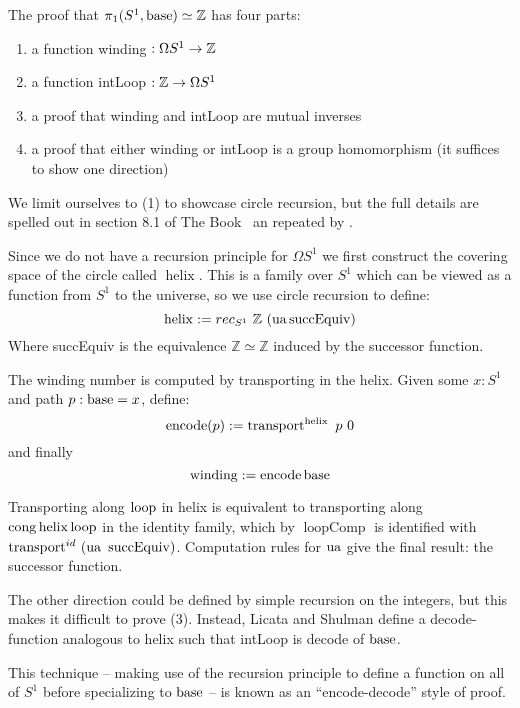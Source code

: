 The proof that $\pi_1(S^1, \operatorname{base}) \simeq \mathbb{Z}$ has four parts:
\begin{enumerate}
  \item a function winding $: \Omega S^1 \rightarrow \mathbb{Z}$
  \item a function intLoop $: \mathbb{Z} \rightarrow \Omega S^1$
  \item a proof that winding and intLoop are mutual inverses
  \item a proof that either winding or intLoop is a group homomorphism (it
    suffices to show one direction)
\end{enumerate}
We limit ourselves to (1) to showcase circle recursion, but the full
details are spelled out in section 8.1 of The Book~\cite{hottbook} an repeated
by \textcite{mortberg2020cubical}.

Since we do not have a recursion principle for $\Omega S^1$ we first construct the
covering space of the circle called $\operatorname{helix}$. This is a family over $S^1$
which can be viewed as a function from $S^1$ to the universe, so we use circle
recursion to define:
\[
  \operatorname{helix} := rec_{S^1} ~ \mathbb{Z} ~ (\operatorname{ua} \operatorname{succEquiv})
\]
Where succEquiv is the equivalence $\mathbb{Z} \simeq \mathbb{Z}$ induced by the
successor function.

The winding number is computed by transporting in the helix. Given some $x:S^1$
and path $p : \operatorname{base} = x$, define:
\[
  \operatorname{encode}(p) := \operatorname{transport}^{\operatorname{helix}}~p~0
\]
and finally
\[
  \operatorname{winding} := \operatorname{encode} \operatorname{base}
\]

Transporting along $\operatorname{loop}$ in helix is equivalent to transporting along
$\operatorname{cong} \operatorname{helix} \operatorname{loop}$ in the identity family, which by $\operatorname{loopComp}$
is identified with $\operatorname{transport}^{id}~(\operatorname{ua}~\operatorname{succEquiv})$. Computation
rules for $\operatorname{ua}$ give the final result: the successor function.

The other direction could be defined by simple recursion on the integers, but
this makes it difficult to prove (3). Instead, Licata and Shulman define a
decode-function analogous to helix such that intLoop is decode of $\operatorname{base}$.

This technique -- making use of the recursion principle to define a function on
all of $S^1$ before specializing to $\operatorname{base}$ -- is known as an ``encode-decode''
style of proof.